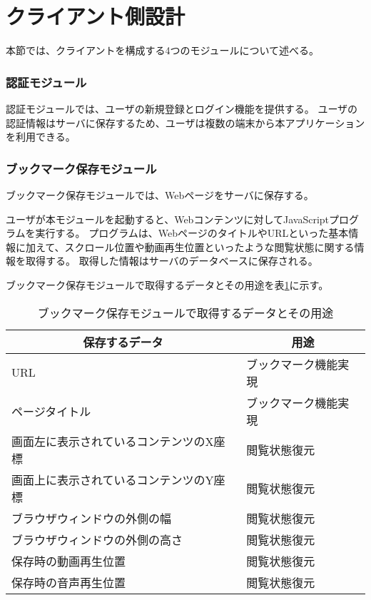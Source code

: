 \section{クライアント側設計}
本節では、クライアントを構成する4つのモジュールについて述べる。

\subsubsection{認証モジュール}
認証モジュールでは、ユーザの新規登録とログイン機能を提供する。
ユーザの認証情報はサーバに保存するため、ユーザは複数の端末から本アプリケーションを利用できる。

\subsubsection{ブックマーク保存モジュール}
ブックマーク保存モジュールでは、Webページをサーバに保存する。

ユーザが本モジュールを起動すると、Webコンテンツに対してJavaScriptプログラムを実行する。
プログラムは、WebページのタイトルやURLといった基本情報に加えて、スクロール位置や動画再生位置といったような閲覧状態に関する情報を取得する。
取得した情報はサーバのデータベースに保存される。

ブックマーク保存モジュールで取得するデータとその用途を表\ref{tb:design-save-bookmark-data-usage}に示す。

\begin{table}[htbp]
  \label{tb:design-save-bookmark-data-usage}
  \caption{ブックマーク保存モジュールで取得するデータとその用途}
  \begin{center}
    \begin{tabular}{|l|l|}
      \hline
      \multicolumn{1}{|c|}{\textbf{保存するデータ}} & \multicolumn{1}{|c|}{\textbf{用途}} \\\hline
      URL & ブックマーク機能実現 \\\hline
      ページタイトル & ブックマーク機能実現 \\\hline
      画面左に表示されているコンテンツのX座標 & 閲覧状態復元 \\\hline
      画面上に表示されているコンテンツのY座標 & 閲覧状態復元 \\\hline
      ブラウザウィンドウの外側の幅 & 閲覧状態復元 \\\hline
      ブラウザウィンドウの外側の高さ & 閲覧状態復元 \\\hline
      保存時の動画再生位置 & 閲覧状態復元 \\\hline
      保存時の音声再生位置 & 閲覧状態復元 \\\hline
    \end{tabular}
  \end{center}
\end{table}

